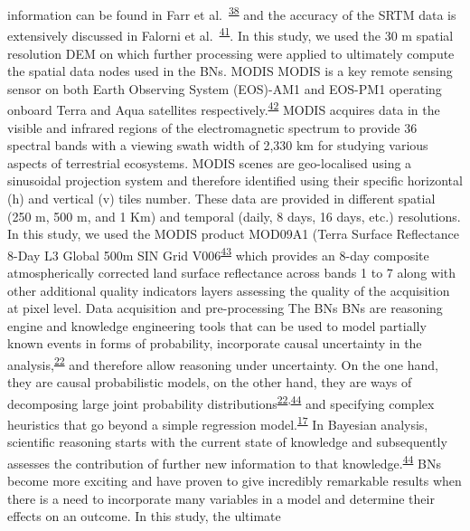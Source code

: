 \documentclass[12pt,oneside]{article}
\begin{document}
information can be found in Farr et
al.~\textsuperscript{\protect\hyperlink{ref-Farr_et_al_2007}{38}} and
the accuracy of the SRTM data is extensively discussed in Falorni et
al.~\textsuperscript{\protect\hyperlink{ref-Falorni_et_al_2005}{41}}. In
this study, we used the 30 m spatial resolution DEM on which further
processing were applied to ultimately compute the spatial data nodes
used in the BNs. MODIS MODIS is a key remote sensing sensor on both
Earth Observing System (EOS)-AM1 and EOS-PM1 operating onboard Terra and
Aqua satellites
respectively.\textsuperscript{\protect\hyperlink{ref-King_et_al_1995}{42}}
MODIS acquires data in the visible and infrared regions of the
electromagnetic spectrum to provide 36 spectral bands with a viewing
swath width of 2,330 km for studying various aspects of terrestrial
ecosystems. MODIS scenes are geo-localised using a sinusoidal projection
system and therefore identified using their specific horizontal (h) and
vertical (v) tiles number. These data are provided in different spatial
(250 m, 500 m, and 1 Km) and temporal (daily, 8 days, 16 days, etc.)
resolutions. In this study, we used the MODIS product MOD09A1 (Terra
Surface Reflectance 8-Day L3 Global 500m SIN Grid
V006\textsuperscript{\protect\hyperlink{ref-Vermote_2015}{43}} which
provides an 8-day composite atmospherically corrected land surface
reflectance across bands 1 to 7 along with other additional quality
indicators layers assessing the quality of the acquisition at pixel
level. Data acquisition and pre-processing The BNs BNs are reasoning
engine and knowledge engineering tools that can be used to model
partially known events in forms of probability, incorporate causal
uncertainty in the
analysis,\textsuperscript{\protect\hyperlink{ref-Pourret_et_al_2008}{22}}
and therefore allow reasoning under uncertainty. On the one hand, they
are causal probabilistic models, on the other hand, they are ways of
decomposing large joint probability
distributions\textsuperscript{\protect\hyperlink{ref-Pourret_et_al_2008}{22},\protect\hyperlink{ref-Pearl_2000}{44}}
and specifying complex heuristics that go beyond a simple regression
model.\textsuperscript{\protect\hyperlink{ref-Whitney_et_al_2018}{17}}
In Bayesian analysis, scientific reasoning starts with the current state
of knowledge and subsequently assesses the contribution of further new
information to that
knowledge.\textsuperscript{\protect\hyperlink{ref-Pearl_2000}{44}} BNs
become more exciting and have proven to give incredibly remarkable
results when there is a need to incorporate many variables in a model
and determine their effects on an outcome. In this study, the ultimate
\end{document}
